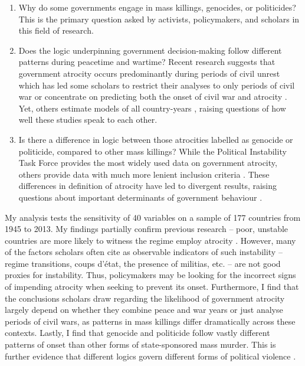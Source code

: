 \documentclass[a4paper,12pt]{article}
\begin{document}
\begin{enumerate}
 \item Why do some governments engage in mass killings, genocides, or politicides? This is the primary question asked by activists, policymakers, and scholars in this field of research. 
 \item Does the logic underpinning government decision-making follow different patterns during peacetime and wartime? Recent research suggests that government atrocity occurs predominantly during periods of civil unrest \citep{harff2003no} which has led some scholars to restrict their analyses to only periods of civil war \citep[e.g.,][]{colaresi2008kill, valentino2004draining} or concentrate on predicting both the onset of civil war and atrocity \citep{goldsmith2013forecasting}. Yet, others estimate models of all country-years \citep[e.g.,][]{krain1997state, montalvo2008discrete}, raising questions of how well these studies speak to each other.
 \item Is there a difference in logic between those atrocities labelled as genocide or politicide, compared to other mass killings? While the Political Instability Task Force \citep{marshall2017pitf} provides the most widely used data on government atrocity, others provide data with much more lenient inclusion criteria \citep[e.g.,][]{stanton2015regulating, ulfelder2012forecasting}. These differences in definition of atrocity have led to divergent results, raising questions about important determinants of government behaviour \citep[for discussion, see][]{straus2007second, uzonyi2016domestic, wayman2010explaining}.
\end{enumerate}

My analysis tests the sensitivity of 40 variables on a sample of 177 countries from 1945 to 2013. My findings partially confirm previous research -- poor, unstable countries are more likely to witness the regime employ atrocity \citep[e.g.,][]{goldsmith2013forecasting,harff2003no,krain1997state}. However, many of the factors scholars often cite as observable indicators of such instability -- regime transitions, coups d'état, the presence of militias, etc. -- are not good proxies for instability. Thus, policymakers may be looking for the incorrect signs of impending atrocity when seeking to prevent its onset. Furthermore, I find that the conclusions scholars draw regarding the likelihood of government atrocity largely depend on whether they combine peace and war years or just analyse periods of civil wars, as patterns in mass killings differ dramatically across these contexts. Lastly, I find that genocide and politicide follow vastly different patterns of onset than other forms of state-sponsored mass murder. This is further evidence that different logics govern different forms of political violence \citep{stanton2013terrorism}.
\end{document}
